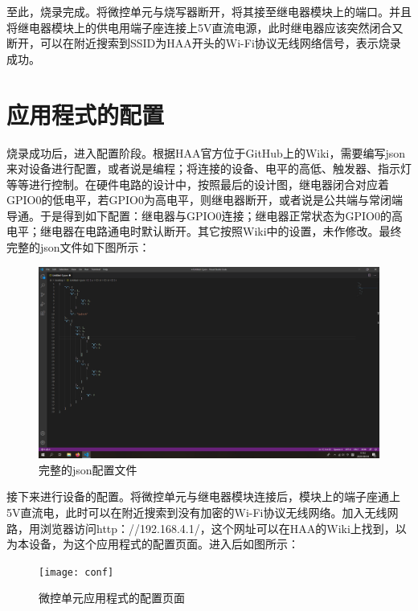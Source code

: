 \par 至此，烧录完成。将微控单元与烧写器断开，将其接至继电器模块上的端口。并且将继电器模块上的供电用端子座连接上5V直流电源，此时继电器应该突然闭合又断开，可以在附近搜索到SSID为HAA开头的Wi-Fi协议无线网络信号，表示烧录成功。

\section{应用程式的配置}

\setlength\parindent{2em} 烧录成功后，进入配置阶段。根据HAA官方位于GitHub上的Wiki，需要编写json来对设备进行配置，或者说是编程；将连接的设备、电平的高低、触发器、指示灯等等进行控制。在硬件电路的设计中，按照最后的设计图，继电器闭合对应着GPIO0的低电平，若GPIO0为高电平，则继电器断开，或者说是公共端与常闭端导通。于是得到如下配置：继电器与GPIO0连接；继电器正常状态为GPIO0的高电平；继电器在电路通电时默认断开。其它按照Wiki中的设置，未作修改。最终完整的json文件如下图所示：

\begin{figure}[h!]
	\includegraphics[width=\textwidth]{json}
	\caption[json]{完整的json配置文件}
\end{figure}

\par 接下来进行设备的配置。将微控单元与继电器模块连接后，模块上的端子座通上5V直流电，此时可以在附近搜索到没有加密的Wi-Fi协议无线网络。加入无线网路，用浏览器访问http：//192.168.4.1/，这个网址可以在HAA的Wiki上找到，以为本设备，为这个应用程式的配置页面。进入后如图所示：

\begin{figure}[h!]
	\texttt{[image: conf]}
	\caption[conf]{微控单元应用程式的配置页面}
\end{figure}


